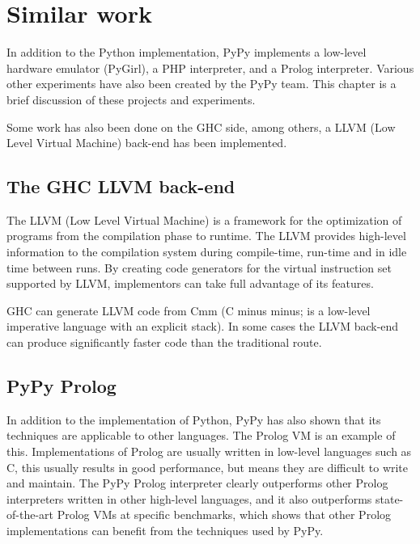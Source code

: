 \chapter{Similar work}
\label{chap:similar}

In addition to the Python implementation, PyPy implements a low-level 
hardware emulator (PyGirl), a PHP interpreter, and a Prolog interpreter. 
Various other experiments have also been created by the PyPy team. This
chapter is a brief discussion of these projects and experiments. 

Some work has also been done on the GHC side, among others, a LLVM
(Low Level Virtual Machine) back-end has been implemented.

\section{The GHC LLVM back-end}

The LLVM (Low Level Virtual Machine) is a framework for the optimization of 
programs from the compilation phase to runtime. The LLVM provides high-level information 
to the compilation system during compile-time, run-time and in idle time between
runs. By creating code generators for the virtual instruction set supported by
LLVM, implementors can take full advantage of its features.
\cite{lattner2004llvm}

GHC can generate LLVM code from Cmm (C minus minus; is a low-level imperative
language with an explicit stack). In some cases the 
LLVM back-end can produce significantly faster code than the traditional route. 
\cite{marlow2012glasgow, terei2010llvm}

\section{PyPy Prolog}

In addition to the implementation of Python, PyPy has also shown that its techniques
are applicable to other languages. The Prolog VM is an example of this. Implementations
of Prolog are usually written in low-level languages such as C, this usually results in
good performance, but means they are difficult to write and maintain. The PyPy Prolog 
interpreter clearly outperforms other Prolog interpreters written in other high-level
languages, and it also outperforms state-of-the-art Prolog VMs at specific benchmarks,
which shows that other Prolog implementations can benefit from the techniques used by
PyPy. \cite{bolz2010towards}

